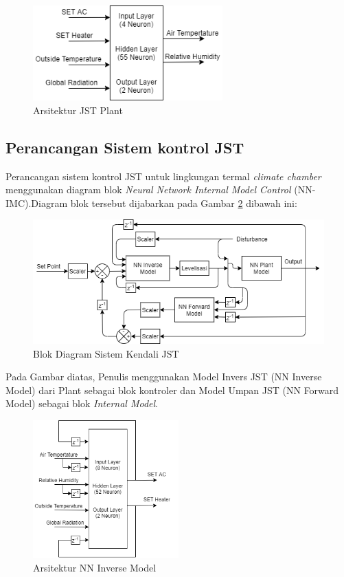 \begin{figure}[!h]
	\centering
	\includegraphics[width=0.65\textwidth]{figures/NNPlantModelDesign}
	\caption{Arsitektur JST Plant}
	\label{fig:4:NNPlantModelDesign}
\end{figure}

\subsection{Perancangan Sistem kontrol JST}
Perancangan sistem kontrol JST untuk lingkungan termal \textit{climate chamber} menggunakan diagram blok \textit{Neural Network Internal Model Control} (NN-IMC).Diagram blok tersebut dijabarkan pada Gambar \ref{fig:4:ConstrolSystemBlockDiagram} dibawah ini:

\begin{figure}[!h]
	\centering
	\includegraphics[width=1\textwidth]{figures/ControlDesignDiagram}
	\caption{Blok Diagram Sistem Kendali JST}
	\label{fig:4:ConstrolSystemBlockDiagram}
\end{figure}

Pada Gambar diatas, Penulis menggunakan Model Invers JST (NN Inverse Model) dari Plant sebagai blok kontroler dan Model Umpan JST (NN Forward Model) sebagai blok \textit{Internal Model}.

\begin{figure}[!h]
	\centering
	\includegraphics[width=0.5\textwidth]{figures/NNInverseModelDesign}
	\caption{Arsitektur NN Inverse Model}
	\label{fig:4:NNInverseModelDesign}
\end{figure}


